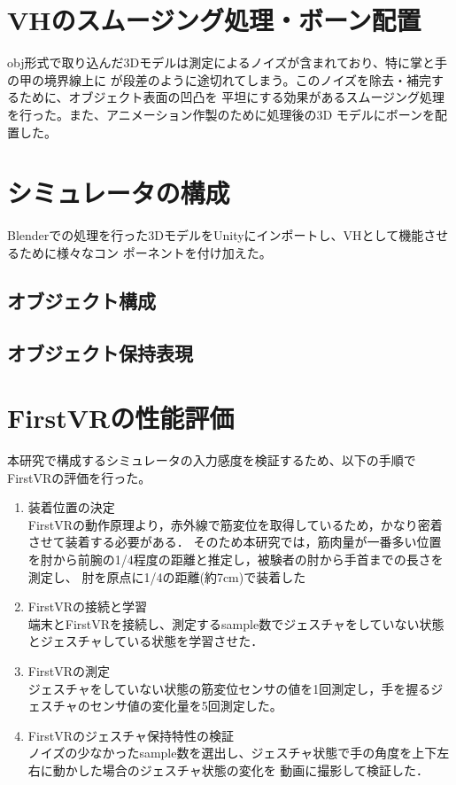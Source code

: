 \documentclass{ltjsreport}
\begin{document}
	\section{VHのスムージング処理・ボーン配置}
		obj形式で取り込んだ3Dモデルは測定によるノイズが含まれており、特に掌と手の甲の境界線上に
		が段差のように途切れてしまう。このノイズを除去・補完するために、オブジェクト表面の凹凸を
		平坦にする効果があるスムージング処理を行った。また、アニメーション作製のために処理後の3D
		モデルにボーンを配置した。

	\section{シミュレータの構成}
		Blenderでの処理を行った3DモデルをUnityにインポートし、VHとして機能させるために様々なコン
		ポーネントを付け加えた。
		\subsection{オブジェクト構成}
		\subsection{オブジェクト保持表現}

	\section{FirstVRの性能評価}
		本研究で構成するシミュレータの入力感度を検証するため、以下の手順でFirstVRの評価を行った。
			\begin{enumerate}
				\item 装着位置の決定\\
					FirstVRの動作原理より，赤外線で筋変位を取得しているため，かなり密着させて装着する必要がある．
					そのため本研究では，筋肉量が一番多い位置を肘から前腕の1/4程度の距離と推定し，被験者の肘から手首までの長さを測定し、
					肘を原点に1/4の距離(約7cm)で装着した
				\item FirstVRの接続と学習\\
					端末とFirstVRを接続し、測定するsample数でジェスチャをしていない状態とジェスチャしている状態を学習させた．
				\item FirstVRの測定\\
					ジェスチャをしていない状態の筋変位センサの値を1回測定し，手を握るジェスチャのセンサ値の変化量を5回測定した。
				\item FirstVRのジェスチャ保持特性の検証\\
					ノイズの少なかったsample数を選出し、ジェスチャ状態で手の角度を上下左右に動かした場合のジェスチャ状態の変化を
					動画に撮影して検証した．
			\end{enumerate}
\end{document}
